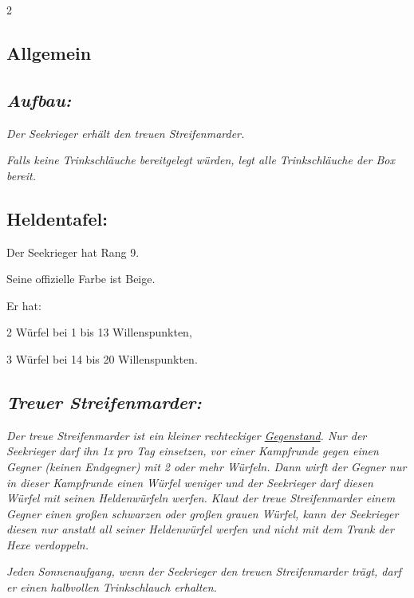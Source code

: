 \documentclass[10pt, a4paper, oneside]{book}
\newcommand{\fan}[1]{\textit{#1}}
\begin{document}
\begin{multicols*}{2}\raggedcolumns


\begin{nobgcolor}

\section{Allgemein}

\subsection{\fan{Aufbau:}}

\fan{Der Seekrieger erhält den treuen Streifenmarder.}

\fan{Falls keine Trinkschläuche bereitgelegt würden, legt alle Trinkschläuche der Box bereit.}



\subsection{Heldentafel:}

Der Seekrieger hat Rang 9.

Seine offizielle Farbe ist Beige.

Er hat:

\bullet{} 2 Würfel bei 1 bis 13 Willenspunkten,

\bullet{} 3 Würfel bei 14 bis 20 Willenspunkten.




\subsection{\fan{Treuer Streifenmarder:}}

\fan{Der treue Streifenmarder ist ein kleiner rechteckiger \hyperref[gegenstaende-und-sonderplaettchen]{Gegenstand}. Nur der Seekrieger darf ihn 1x pro Tag einsetzen, vor einer Kampfrunde gegen einen Gegner (keinen Endgegner) mit 2 oder mehr Würfeln. Dann wirft der Gegner nur in dieser Kampfrunde einen Würfel weniger und der Seekrieger darf diesen Würfel mit seinen Heldenwürfeln werfen. Klaut der treue Streifenmarder einem Gegner einen großen schwarzen oder großen grauen Würfel, kann der Seekrieger diesen nur anstatt all seiner Heldenwürfel werfen und nicht mit dem Trank der Hexe verdoppeln.}

\fan{Jeden Sonnenaufgang, wenn der Seekrieger den treuen Streifenmarder trägt, darf er einen halbvollen Trinkschlauch erhalten.}


\end{nobgcolor}
\end{multicols*}
\end{document}
